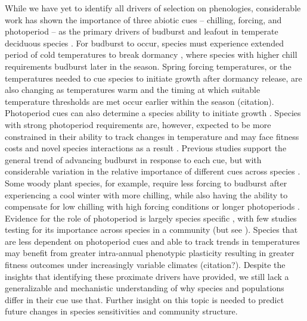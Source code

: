 \documentclass{article}\usepackage[]{graphicx}\usepackage[]{color}
\begin{document}
While we have yet to identify all drivers of selection on phenologies, considerable work has shown the importance of three abiotic cues -- chilling, forcing, and photoperiod -- as the primary drivers of budburst and leafout in temperate deciduous species \citep{Basler2014,Chuine2016, Harrington2016,Flynn2018}. For budburst to occur, species must experience extended period of cold temperatures to break dormancy \citep{Cooke2012}, where species with higher chill requirements budburst later in the season. Spring forcing temperatures, or the temperatures needed to cue species to initiate growth after dormancy release, are also changing as temperatures warm and the timing at which suitable temperature thresholds are met occur earlier within the season (citation). Photoperiod cues can also determine a species ability to initiate growth \citep{Basler2014,Zohner2020}. Species with strong photoperiod requirements are, however, expected to be more constrained in their ability to track changes in temperature and may face fitness costs and novel species interactions as a result \citep{Guy2014, others?}. Previous studies support the general trend of advancing budburst in response to each cue, but with considerable variation in the relative importance of different cues across species \citep{Chuine2016,Flynn2018}. Some woody plant species, for example, require less forcing to budburst after experiencing a cool winter with more chilling, while also having the ability to compensate for low chilling with high forcing conditions or longer photoperiods \citep{Laube2014,Harrington2015,Flynn2018,Caffarra2011,Basler2014,Zohner2016}. Evidence for the role of photoperiod is largely species specific  \citep{Heide1993, Basler2014, Singh2017, Zohner2016}, with few studies testing for its importance across species in a community (but see  \cite{Flynn2018}). Species that are less dependent on photoperiod cues and able to track trends in temperatures may benefit from greater intra-annual phenotypic plasticity resulting in greater fitness outcomes under increasingly variable climates (citation?). Despite the insights that identifying these proximate drivers have provided, we still lack a generalizable and mechanistic understanding of why species and populations differ in their cue use that. Further insight on this topic is needed to predict future changes in species sensitivities and community structure.\\
\end{document}
